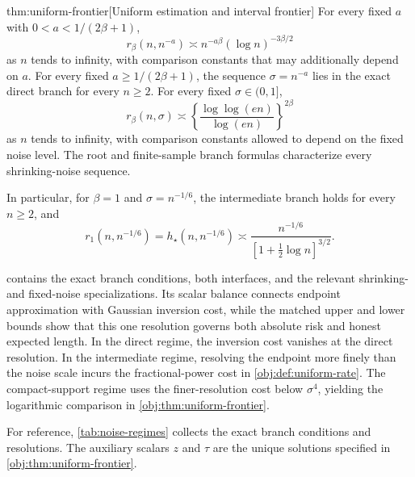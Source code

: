 \begin{theoremv}{thm:uniform-frontier}[Uniform estimation and interval frontier]
For every fixed \(a\) with \(0<a<1/(2\beta+1)\),
\[
r_\beta(n,n^{-a})
\asymp n^{-a\beta}(\log n)^{-3\beta/2}
\]
as \(n\) tends to infinity, with comparison constants that may additionally depend on \(a\). For every fixed \(a\ge1/(2\beta+1)\), the sequence \(\sigma=n^{-a}\) lies in the exact direct branch for every \(n\ge2\). For every fixed \(\sigma\in(0,1]\),
\[
r_\beta(n,\sigma)
\asymp
\left\{\frac{\log\log(en)}{\log(en)}\right\}^{2\beta}
\]
as \(n\) tends to infinity, with comparison constants allowed to depend on the fixed noise level. The root and finite-sample branch formulas characterize every shrinking-noise sequence.

In particular, for \(\beta=1\) and \(\sigma=n^{-1/6}\), the intermediate branch holds for every \(n\ge2\), and
\[
r_1(n,n^{-1/6})
=h_\star(n,n^{-1/6})
\asymp
\frac{n^{-1/6}}{[1+\tfrac12\log n]^{3/2}}.
\]
\end{theoremv}

 contains the exact branch conditions, both interfaces, and the relevant shrinking- and fixed-noise specializations. Its scalar balance connects endpoint approximation with Gaussian inversion cost, while the matched upper and lower bounds show that this one resolution governs both absolute risk and honest expected length. In the direct regime, the inversion cost vanishes at the direct resolution. In the intermediate regime, resolving the endpoint more finely than the noise scale incurs the fractional-power cost in \cref{obj:def:uniform-rate}. The compact-support regime uses the finer-resolution cost below \(\sigma^4\), yielding the logarithmic comparison in \cref{obj:thm:uniform-frontier}.

For reference, \cref{tab:noise-regimes} collects the exact branch conditions and resolutions. The auxiliary scalars \(z\) and \(\tau\) are the unique solutions specified in \cref{obj:thm:uniform-frontier}.

